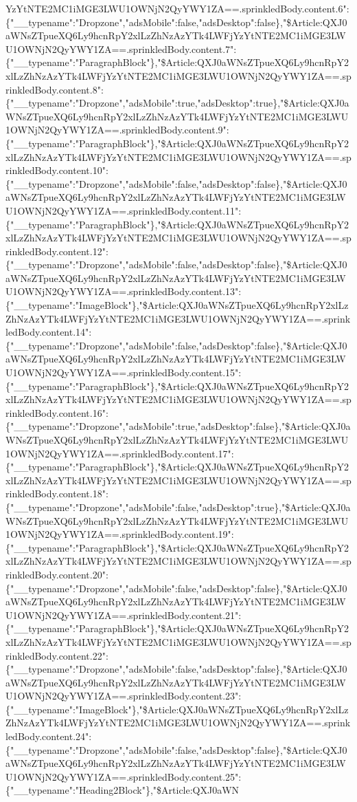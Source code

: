 YzYtNTE2MC1iMGE3LWU1OWNjN2QyYWY1ZA==.sprinkledBody.content.6":\{"\_\_typename":"Dropzone","adsMobile":false,"adsDesktop":false\},"\$Article:QXJ0aWNsZTpueXQ6Ly9hcnRpY2xlLzZhNzAzYTk4LWFjYzYtNTE2MC1iMGE3LWU1OWNjN2QyYWY1ZA==.sprinkledBody.content.7":\{"\_\_typename":"ParagraphBlock"\},"\$Article:QXJ0aWNsZTpueXQ6Ly9hcnRpY2xlLzZhNzAzYTk4LWFjYzYtNTE2MC1iMGE3LWU1OWNjN2QyYWY1ZA==.sprinkledBody.content.8":\{"\_\_typename":"Dropzone","adsMobile":true,"adsDesktop":true\},"\$Article:QXJ0aWNsZTpueXQ6Ly9hcnRpY2xlLzZhNzAzYTk4LWFjYzYtNTE2MC1iMGE3LWU1OWNjN2QyYWY1ZA==.sprinkledBody.content.9":\{"\_\_typename":"ParagraphBlock"\},"\$Article:QXJ0aWNsZTpueXQ6Ly9hcnRpY2xlLzZhNzAzYTk4LWFjYzYtNTE2MC1iMGE3LWU1OWNjN2QyYWY1ZA==.sprinkledBody.content.10":\{"\_\_typename":"Dropzone","adsMobile":false,"adsDesktop":false\},"\$Article:QXJ0aWNsZTpueXQ6Ly9hcnRpY2xlLzZhNzAzYTk4LWFjYzYtNTE2MC1iMGE3LWU1OWNjN2QyYWY1ZA==.sprinkledBody.content.11":\{"\_\_typename":"ParagraphBlock"\},"\$Article:QXJ0aWNsZTpueXQ6Ly9hcnRpY2xlLzZhNzAzYTk4LWFjYzYtNTE2MC1iMGE3LWU1OWNjN2QyYWY1ZA==.sprinkledBody.content.12":\{"\_\_typename":"Dropzone","adsMobile":false,"adsDesktop":false\},"\$Article:QXJ0aWNsZTpueXQ6Ly9hcnRpY2xlLzZhNzAzYTk4LWFjYzYtNTE2MC1iMGE3LWU1OWNjN2QyYWY1ZA==.sprinkledBody.content.13":\{"\_\_typename":"ImageBlock"\},"\$Article:QXJ0aWNsZTpueXQ6Ly9hcnRpY2xlLzZhNzAzYTk4LWFjYzYtNTE2MC1iMGE3LWU1OWNjN2QyYWY1ZA==.sprinkledBody.content.14":\{"\_\_typename":"Dropzone","adsMobile":false,"adsDesktop":false\},"\$Article:QXJ0aWNsZTpueXQ6Ly9hcnRpY2xlLzZhNzAzYTk4LWFjYzYtNTE2MC1iMGE3LWU1OWNjN2QyYWY1ZA==.sprinkledBody.content.15":\{"\_\_typename":"ParagraphBlock"\},"\$Article:QXJ0aWNsZTpueXQ6Ly9hcnRpY2xlLzZhNzAzYTk4LWFjYzYtNTE2MC1iMGE3LWU1OWNjN2QyYWY1ZA==.sprinkledBody.content.16":\{"\_\_typename":"Dropzone","adsMobile":true,"adsDesktop":false\},"\$Article:QXJ0aWNsZTpueXQ6Ly9hcnRpY2xlLzZhNzAzYTk4LWFjYzYtNTE2MC1iMGE3LWU1OWNjN2QyYWY1ZA==.sprinkledBody.content.17":\{"\_\_typename":"ParagraphBlock"\},"\$Article:QXJ0aWNsZTpueXQ6Ly9hcnRpY2xlLzZhNzAzYTk4LWFjYzYtNTE2MC1iMGE3LWU1OWNjN2QyYWY1ZA==.sprinkledBody.content.18":\{"\_\_typename":"Dropzone","adsMobile":false,"adsDesktop":true\},"\$Article:QXJ0aWNsZTpueXQ6Ly9hcnRpY2xlLzZhNzAzYTk4LWFjYzYtNTE2MC1iMGE3LWU1OWNjN2QyYWY1ZA==.sprinkledBody.content.19":\{"\_\_typename":"ParagraphBlock"\},"\$Article:QXJ0aWNsZTpueXQ6Ly9hcnRpY2xlLzZhNzAzYTk4LWFjYzYtNTE2MC1iMGE3LWU1OWNjN2QyYWY1ZA==.sprinkledBody.content.20":\{"\_\_typename":"Dropzone","adsMobile":false,"adsDesktop":false\},"\$Article:QXJ0aWNsZTpueXQ6Ly9hcnRpY2xlLzZhNzAzYTk4LWFjYzYtNTE2MC1iMGE3LWU1OWNjN2QyYWY1ZA==.sprinkledBody.content.21":\{"\_\_typename":"ParagraphBlock"\},"\$Article:QXJ0aWNsZTpueXQ6Ly9hcnRpY2xlLzZhNzAzYTk4LWFjYzYtNTE2MC1iMGE3LWU1OWNjN2QyYWY1ZA==.sprinkledBody.content.22":\{"\_\_typename":"Dropzone","adsMobile":false,"adsDesktop":false\},"\$Article:QXJ0aWNsZTpueXQ6Ly9hcnRpY2xlLzZhNzAzYTk4LWFjYzYtNTE2MC1iMGE3LWU1OWNjN2QyYWY1ZA==.sprinkledBody.content.23":\{"\_\_typename":"ImageBlock"\},"\$Article:QXJ0aWNsZTpueXQ6Ly9hcnRpY2xlLzZhNzAzYTk4LWFjYzYtNTE2MC1iMGE3LWU1OWNjN2QyYWY1ZA==.sprinkledBody.content.24":\{"\_\_typename":"Dropzone","adsMobile":false,"adsDesktop":false\},"\$Article:QXJ0aWNsZTpueXQ6Ly9hcnRpY2xlLzZhNzAzYTk4LWFjYzYtNTE2MC1iMGE3LWU1OWNjN2QyYWY1ZA==.sprinkledBody.content.25":\{"\_\_typename":"Heading2Block"\},"\$Article:QXJ0aWN
